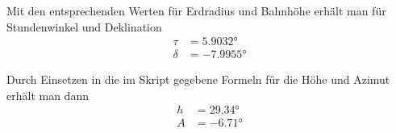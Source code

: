 \documentclass[a4paper,german,12pt,smallheadings]{scrartcl}
\begin{document}
\begin{enumerate}[a)]
    Mit den entsprechenden Werten für Erdradius und Bahnhöhe erhält man für Stundenwinkel und Deklination
    \begin{align}
      \tau &= \ang{5.9032} \\
      \delta &= \ang{-7.9955}
    \end{align}

    Durch Einsetzen in die im Skript gegebene Formeln für die Höhe und Azimut
    erhält man dann
    \begin{align}
      h &= \ang{29.34} \\
      A &= \ang{-6.71}
    \end{align}

\end{enumerate}
\end{document}
